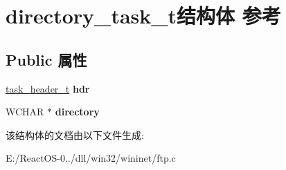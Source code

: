 \hypertarget{structdirectory__task__t}{}\section{directory\+\_\+task\+\_\+t结构体 参考}
\label{structdirectory__task__t}
\subsection*{Public 属性}
\begin{DoxyCompactItemize}
\item 
\mbox{\label{structdirectory__task__t_ace7418e293472d0445cf9b43d16a54b8}} 
\hyperlink{structtask__header__t}{task\+\_\+header\+\_\+t} {\bfseries hdr}
\item 
\mbox{\label{structdirectory__task__t_a4b42b9897c7678b00c14d40af4ee58b4}} 
W\+C\+H\+AR $\ast$ {\bfseries directory}
\end{DoxyCompactItemize}


该结构体的文档由以下文件生成\+:\begin{DoxyCompactItemize}
\item 
E\+:/\+React\+O\+S-\/0../dll/win32/wininet/ftp.\+c\end{DoxyCompactItemize}
